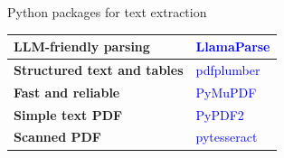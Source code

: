 

\begin{simpleCenteringTempChapterTable}{Python packages for text extraction}

    \def\cellOneA{\textbf{Structured text and tables}}
    \def\cellOneB{\textcolor{blue}{pdfplumber}}

    \def\cellTwoA{\textbf{Fast and reliable}}
    \def\cellTwoB{\textcolor{blue}{PyMuPDF}}

    \def\cellThreeA{\textbf{Simple text PDF}}
    \def\cellThreeB{\textcolor{blue}{PyPDF2}}

    \def\cellFourA{\textbf{Scanned PDF}}
    \def\cellFourB{\textcolor{blue}{pytesseract}}

    \def\cellFiveA{\textbf{LLM-friendly parsing}}
    \def\cellFiveB{\textcolor{blue}{LlamaParse}}

    \begin{tabular}{|l|l|} \hline
        \cellFiveA      &   \cellFiveB      \\ \hline
        \cellOneA       &   \cellOneB       \\ \hline
        \cellTwoA       &   \cellTwoB       \\ \hline
        \cellThreeA     &   \cellThreeB     \\ \hline
        \cellFourA      &   \cellFourB     \\ \hline
    \end{tabular}

\end{simpleCenteringTempChapterTable}